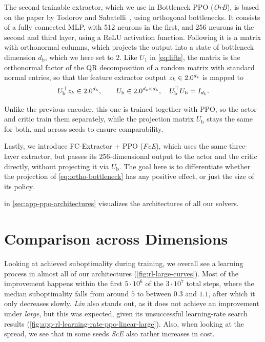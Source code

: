 The second trainable extractor, which we use in Bottleneck PPO (\emph{OrB}), is based on the paper by Todorov and Sabatelli~\cite{Todorov2026Orthogonal},
using orthogonal bottlenecks. It consists of a fully connected MLP, with 512 neurons in the first,
and 256 neurons in the second and third layer, using a ReLU activation function.
Following it is a matrix with orthonormal columns, which projects the output
into a state of bottleneck dimension $d_{\mathrm{b}}$, which we here set to $2$. Like $U_1$ in \eqref{eq:lifts}, the matrix
is the orthonormal factor of the QR decomposition of a random matrix with standard normal entries, so that the
feature extractor output $z_k \in 2.0^{d_{\mathrm{z}}}$ is mapped to
\begin{equation}
    \label{eq:ortho-bottleneck}
    U_{\mathrm{b}}^{\top} z_k \in 2.0^{d_{\mathrm{b}}} ,
    \qquad U_{\mathrm{b}} \in 2.0^{d_{\mathrm{z}} \times d_{\mathrm{b}}} , \quad U_{\mathrm{b}}^{\top} U_{\mathrm{b}} = I_{d_{\mathrm{b}}} .
\end{equation}

Unlike the previous encoder, this one is trained together with PPO, so the actor and critic train them separately, while
the projection matrix $U_{\mathrm{b}}$ stays the same for both, and across seeds to ensure comparability.

Lastly, we introduce FC-Extractor + PPO (\emph{FcE}), which uses the same three-layer extractor, but passes its $256$-dimensional
output to the actor and the critic directly, without projecting it via $U_{\mathrm{b}}$. The goal here is to differentiate
whether the projection of \eqref{eq:ortho-bottleneck} has any positive effect, or just the size of its policy.

 in \cref{sec:app-ppo-architectures} visualizes the architectures of all our solvers.

\section{Comparison across Dimensions}
\label{sec:rl-comparison}

Looking at achieved suboptimality during training, we overall see a learning process in almost all
of our architectures (\cref{fig:rl-large-curves}). Most of the improvement happens within the first $5 \cdot 10^{6}$ of the
$3 \cdot 10^{7}$ total steps, where the median suboptimality falls from around $5$ to between $0.3$ and $1.1$, after which it only decreases slowly.
\emph{Lin} also stands out, as it does not achieve an
improvement under \emph{large}, but this was expected, given its unsuccessful learning-rate search results
(\cref{fig:app-rl-learning-rate-ppo-linear-large}). Also, when looking at the spread, we see that in some seeds
\emph{ScE} also rather increases in cost.

